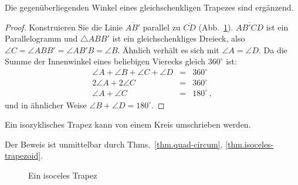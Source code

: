 \begin{theorem}\label{thm.isoceles-trapezoid}
Die gegenüberliegenden Winkel eines gleichschenkligen Trapezes sind ergänzend.
\end{theorem}
\begin{proof}
Konstruieren Sie die Linie $\overline{AB'}$ parallel zu $\overline{CD}$ (Abb.~\ref{f.trap-3}). $\overline{AB'CD}$ ist ein Parallelogramm und $\triangle ABB'$ ist ein gleichschenkliges Dreieck, also $\angle C= \angle ABB' = \angle AB'B = \angle B$. Ähnlich verhält es sich mit $\angle A = \angle D$. Da die Summe der Innenwinkel eines beliebigen Vierecks gleich $360^\circ$ ist:
\begin{eqnarray*}
\angle A + \angle B + \angle C + \angle D &=& 360^\circ\\
2\angle A + 2 \angle C &=& 360^\circ\\
\angle A +  \angle C &=& 180^\circ\,,
\end{eqnarray*}
und in ähnlicher Weise $\angle B +  \angle D = 180^\circ$.
\end{proof}
\begin{theorem}
Ein isozyklisches Trapez kann von einem Kreis umschrieben werden.
\end{theorem}
Der Beweis ist unmittelbar durch Thms.~\ref{thm.quad-circum}, \ref{thm.isoceles-trapezoid}.

\begin{figure}[t]
\begin{center}
\end{center}
\caption{Ein isoceles Trapez}\label{f.trap-3}
\end{figure}


